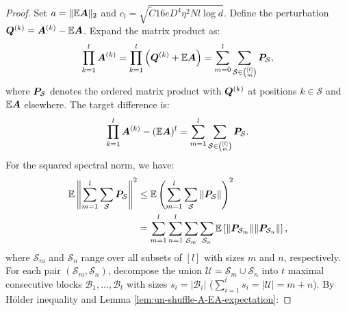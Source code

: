 \begin{proof}
Set \( a = \|\mathbb{E}{\bm{A}}\|_2 \) and \( c_l = \sqrt{\widetilde{C}16eD^4\eta^2N l\log d} \). Define the perturbation \({\bm{Q}}^{(k)} = {\bm{A}}^{(k)} - \mathbb{E}{\bm{A}}\). Expand the matrix product as:
\[
\prod_{k=1}^l {\bm{A}}^{(k)} = \prod_{k=1}^l \left( {\bm{Q}}^{(k)} + \mathbb{E}{\bm{A}} \right) = \sum_{m=0}^l \sum_{\mathcal{S} \in \binom{[l]}{m}} {\bm{P}}_{\mathcal{S}},
\]
where \({\bm{P}}_{\mathcal{S}}\) denotes the ordered matrix product with \({\bm{Q}}^{(k)}\) at positions \(k \in \mathcal{S}\) and \(\mathbb{E}{\bm{A}}\) elsewhere. The target difference is:
\[
\prod_{k=1}^l {\bm{A}}^{(k)} - (\mathbb{E}{\bm{A}})^l = \sum_{m=1}^l \sum_{\mathcal{S} \in \binom{[l]}{m}} {\bm{P}}_{\mathcal{S}}.
\]
For the squared spectral norm, we have:
\begin{align*}
\mathbb{E} \left\| \sum_{m=1}^l \sum_{\mathcal{S}} {\bm{P}}_{\mathcal{S}} \right\|^2 
&\leq \mathbb{E} \left( \sum_{m=1}^l \sum_{\mathcal{S}} \|{\bm{P}}_{\mathcal{S}}\| \right)^2 \\
&= \sum_{m=1}^l \sum_{n=1}^l \sum_{\mathcal{S}_m} \sum_{\mathcal{S}_n} \mathbb{E} \left[ \|{\bm{P}}_{\mathcal{S}_m}\| \|{\bm{P}}_{\mathcal{S}_n}\| \right],
\end{align*}
where \(\mathcal{S}_m\) and \(\mathcal{S}_n\) range over all subsets of \([l]\) with sizes \(m\) and \(n\), respectively. For each pair \((\mathcal{S}_m, \mathcal{S}_n)\), decompose the union \(\mathcal{U} = \mathcal{S}_m \cup \mathcal{S}_n\) into \(t\) maximal consecutive blocks \(\mathcal{B}_1, \dots, \mathcal{B}_t\) with sizes \(s_i = |\mathcal{B}_i|\) (\(\sum_{i=1}^t s_i = |\mathcal{U}| = m + n\)). By Hölder inequality and Lemma \ref{lem:un-shuffle-A-EA-expectation}:


\end{proof}
